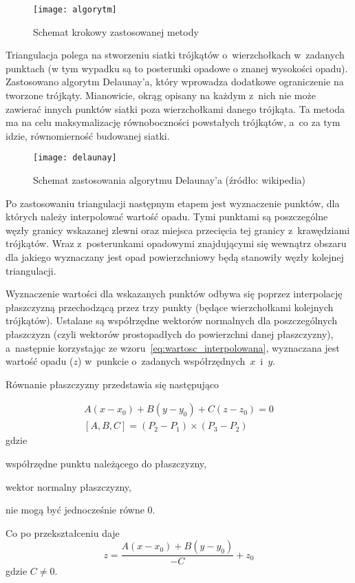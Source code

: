 \begin{figure}[!ht]
	\centering
	\texttt{[image: algorytm]}
	\caption{Schemat krokowy zastosowanej metody}
	\label{fig:algorytm}
\end{figure}

Triangulacja polega na stworzeniu siatki trójkątów o~wierzchołkach w~zadanych punktach (w tym wypadku są to posterunki opadowe o znanej wysokości opadu). Zastosowano algorytm Delaunay'a, który wprowadza dodatkowe ograniczenie na tworzone trójkąty. Mianowicie, okrąg opisany na każdym z~nich nie może zawierać innych punktów siatki poza wierzchołkami danego trójkąta. Ta metoda ma na celu maksymalizację równoboczności powstałych trójkątów, a~co za tym idzie, równomierność budowanej siatki.

\begin{figure}[!ht]
	\centering
	\texttt{[image: delaunay]}
	\caption{Schemat zastosowania algorytmu Delaunay'a (źródło: wikipedia)}
	\label{fig:delaunay}
\end{figure}

Po zastosowaniu triangulacji następnym etapem jest wyznaczenie punktów, dla których należy interpolować wartość opadu. Tymi punktami są poszczególne węzły granicy wskazanej zlewni oraz miejsca przecięcia tej granicy z~krawędziami trójkątów. Wraz z~posterunkami opadowymi znajdującymi się wewnątrz obszaru dla jakiego wyznaczany jest opad powierzchniowy będą stanowiły węzły kolejnej triangulacji.

Wyznaczenie wartości dla wskazanych punktów odbywa się poprzez interpolację płaszczyzną przechodzącą przez trzy punkty (będące wierzchołkami kolejnych trójkątów). Ustalane są współrzędne wektorów normalnych dla poszczególnych płaszczyzn (czyli wektorów prostopadłych do powierzchni danej płaszczyzny), a~następnie korzystając ze wzoru~\ref{eq:wartosc_interpolowana}, wyznaczana jest wartość opadu ($z$) w~punkcie o~zadanych współrzędnych~$x$~i~$y$.

Równanie płaszczyzny przedstawia się następująco

\begin{equation}
\begin{gathered}
A(x - x_0) + B(y - y_0) + C(z - z_0) = 0 \\
[A, B, C] = (P_2 - P_1) \times (P_3 - P_2)
\label{eq:rownanie_plaszczyzny}
\end{gathered}
\end{equation}
gdzie
\begin{description}[leftmargin=3cm, itemsep=0cm, labelsep=0cm]
	\item[$x_0, y_0, z_0$] współrzędne punktu należącego do płaszczyzny,
	\item[$A, B, C$] wektor normalny płaszczyzny, %
	\item[$A, B, C$] nie mogą być jednocześnie równe 0.
\end{description}
%
Co po przekształceniu daje
\begin{equation}
\label{eq:wartosc_interpolowana}
	z = \frac{A(x - x_0) + B(y - y_0)}{-C} + z_0
\end{equation}
gdzie $C \neq 0$.


